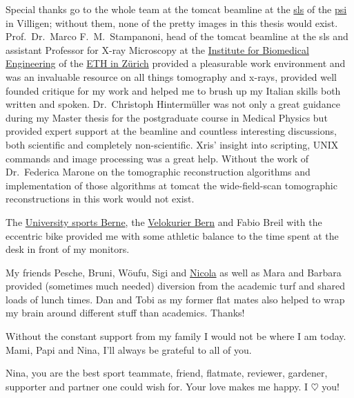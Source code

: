 Special thanks go to the whole team at the \acs{tomcat} beamline at the \href{http://sls.web.psi.ch/}{\acl{sls}} of the \href{http://psi.ch/}{\acl{psi}} in Villigen; without them, none of the pretty images in this thesis would exist. Prof.\ Dr.\ Marco F.\ M.\ Stampanoni, head of the \acs{tomcat} beamline at the \acl{sls} and assistant Professor for X-ray Microscopy at the \href{http://www.biomed.ee.ethz.ch/}{Institute for Biomedical Engineering} of the \href{http://ethz.ch/}{ETH in Zürich} provided a pleasurable work environment and was an invaluable resource on all things tomography and x-rays, provided well founded critique for my work and helped me to brush up my Italian skills both written and spoken. Dr.\ Christoph Hintermüller was not only a great guidance during my Master thesis for the postgraduate course in Medical Physics but provided expert support at the beamline and countless interesting discussions, both scientific and completely non-scientific. Xris' insight into scripting, UNIX commands and image processing was a great help. Without the work of Dr.\ Federica Marone on the tomographic reconstruction algorithms and implementation of those algorithms at \acs{tomcat} the wide-field-scan tomographic reconstructions in this work would not exist.

The \href{http://www.sport.unibe.ch/}{University sports Berne}, the \href{http://velokurierbern.ch/}{Velokurier Bern} and Fabio Breil with the eccentric bike provided me with some athletic balance to the time spent at the desk in front of my monitors.

My friends Pesche, Bruni, Wöufu, Sigi and \href{http://www.nicolafrombern.com/}{Nicola} as well as Mara and Barbara provided (sometimes much needed) diversion from the academic turf and shared loads of lunch times. Dan and Tobi as my former flat mates also helped to wrap my brain around different stuff than academics. Thanks!

Without the constant support from my family I would not be where I am today. Mami, Papi and Nina, I'll always be grateful to all of you.

Nina, you are the best sport teammate, friend, flatmate, reviewer, gardener, supporter and partner one could wish for. Your love makes me happy. I {\color{red}$\heartsuit$} you!
\endgroup